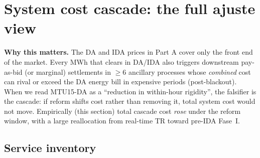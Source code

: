\documentclass[11pt,a4paper]{article}
\begin{document}
\section{System cost cascade: the full ajuste view}\label{sec:prov:full_cascade}

\textbf{Why this matters.} The DA and IDA prices in Part A cover only the front end of the market. Every MWh that clears in DA/IDA also triggers downstream pay-as-bid (or marginal) settlements in $\ge 6$ ancillary processes whose \emph{combined} cost can rival or exceed the DA energy bill in expensive periods (post-blackout). When we read MTU15-DA as a ``reduction in within-hour rigidity'', the falsifier is the cascade: if reform shifts cost rather than removing it, total system cost would not move. Empirically (this section) total cascade cost \emph{rose} under the reform window, with a large reallocation from real-time TR toward pre-IDA Fase~I.

\subsection{Service inventory}\label{sec:prov:full_cascade:inventory}
\end{document}
